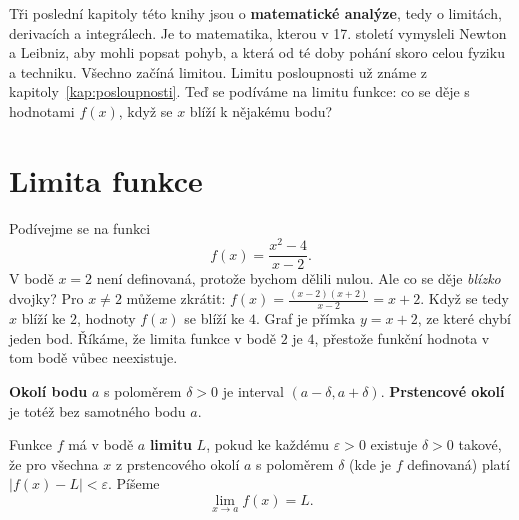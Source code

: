 \label{kap:limity}

Tři poslední kapitoly této knihy jsou o \textbf{matematické analýze}, tedy o limitách, derivacích a integrálech. Je to matematika, kterou v 17. století vymysleli Newton a Leibniz, aby mohli popsat pohyb, a která od té doby pohání skoro celou fyziku a techniku. Všechno začíná limitou. Limitu posloupnosti už známe z kapitoly~\ref{kap:posloupnosti}. Teď se podíváme na limitu funkce: co se děje s hodnotami $f(x)$, když se $x$ blíží k nějakému bodu?

\section{Limita funkce}\label{sec:limita-funkce}

Podívejme se na funkci
\begin{equation*}
  f(x) = \frac{x^2 - 4}{x - 2}.
\end{equation*}
V bodě $x = 2$ není definovaná, protože bychom dělili nulou. Ale co se děje \textit{blízko} dvojky? Pro $x\neq 2$ můžeme zkrátit: $f(x) = \frac{(x - 2)(x + 2)}{x - 2} = x + 2$. Když se tedy $x$ blíží ke $2$, hodnoty $f(x)$ se blíží ke $4$. Graf je přímka $y = x + 2$, ze které chybí jeden bod. Říkáme, že limita funkce v bodě $2$ je $4$, přestože funkční hodnota v tom bodě vůbec neexistuje.

\begin{center}
\end{center}

\begin{definitionbox}
  \textbf{Okolí bodu} $a$ s poloměrem $\delta > 0$ je interval $(a - \delta, a + \delta)$. \textbf{Prstencové okolí} je totéž bez samotného bodu $a$.

  \vspace{0.2cm}

  Funkce $f$ má v bodě $a$ \textbf{limitu} $L$, pokud ke každému $\varepsilon > 0$ existuje $\delta > 0$ takové, že pro všechna $x$ z prstencového okolí $a$ s poloměrem $\delta$ (kde je $f$ definovaná) platí $|f(x) - L| < \varepsilon$. Píšeme
  \begin{equation*}
    \lim_{x\to a} f(x) = L.
  \end{equation*}
\end{definitionbox}

